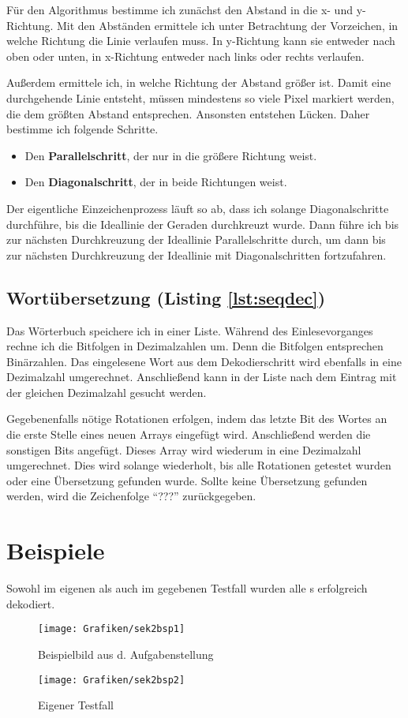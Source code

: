 Für den Algorithmus bestimme ich zunächst den Abstand in die x- und y-Richtung. Mit den Abständen ermittele ich unter Betrachtung der Vorzeichen, in welche Richtung die Linie verlaufen muss. In y-Richtung kann sie entweder nach oben oder unten, in x-Richtung entweder nach links oder rechts verlaufen.

Außerdem ermittele ich, in welche Richtung der Abstand größer ist.
Damit eine durchgehende Linie entsteht, müssen mindestens so viele Pixel markiert werden, die dem größten Abstand entsprechen. Ansonsten entstehen Lücken. Daher bestimme ich folgende Schritte.
\begin{itemize}
	\item Den \textbf{Parallelschritt}, der nur in die größere Richtung weist. 
	\item Den \textbf{Diagonalschritt}, der in beide Richtungen weist.
\end{itemize}

Der eigentliche Einzeichenprozess läuft so ab, dass ich solange Diagonalschritte durchführe, bis die Ideallinie der Geraden durchkreuzt wurde. Dann führe ich bis zur nächsten Durchkreuzung der Ideallinie Parallelschritte durch, um dann bis zur nächsten Durchkreuzung der Ideallinie mit Diagonalschritten fortzufahren.

\subsection{Wortübersetzung (Listing \ref{lst:seqdec})}
Das Wörterbuch speichere ich in einer Liste. Während des Einlesevorganges rechne ich die Bitfolgen in Dezimalzahlen um. Denn die Bitfolgen entsprechen Binärzahlen.
Das eingelesene Wort aus dem Dekodierschritt wird ebenfalls in eine Dezimalzahl umgerechnet. Anschließend kann in der Liste nach dem Eintrag mit der gleichen Dezimalzahl gesucht werden.

Gegebenenfalls nötige Rotationen erfolgen, indem das letzte Bit des Wortes an die erste Stelle eines neuen Arrays eingefügt wird. Anschließend werden die sonstigen Bits angefügt.
Dieses Array wird wiederum in eine Dezimalzahl umgerechnet. Dies wird solange wiederholt, bis alle Rotationen getestet wurden oder eine Übersetzung gefunden wurde.
Sollte keine Übersetzung gefunden werden, wird die Zeichenfolge "`???"' zurückgegeben. 

\pagebreak
\section{Beispiele}
Sowohl im eigenen als auch im gegebenen Testfall wurden alle \task{}s erfolgreich dekodiert.
\begin{figure}[!ht]
	\centering	
	\texttt{[image: Grafiken/sek2bsp1]}
	\caption{Beispielbild aus d. Aufgabenstellung}
\end{figure}
\vfill{}
\begin{figure}[!ht]
	\centering	
	\texttt{[image: Grafiken/sek2bsp2]}
	\caption{Eigener Testfall}
\end{figure}
